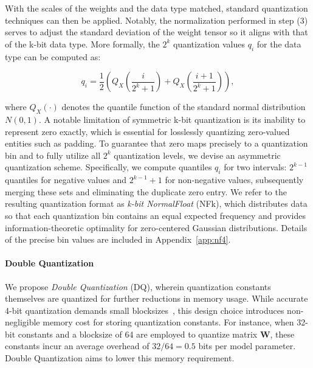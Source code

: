 With the scales of the weights and the data type matched, standard quantization techniques can then be applied. Notably, the normalization performed in step (3) serves to adjust the standard deviation of the weight tensor so it aligns with that of the k-bit data type. More formally, the $2^k$ quantization values $q_i$ for the data type can be computed as:

\begin{equation}
q_i  = \frac{1}{2}\left( Q_X\left(\frac{i}{2^k+1}\right) + Q_X\left(\frac{i+1}{2^k+1}\right)\right),
\end{equation}

where $Q_X(\cdot)$ denotes the quantile function of the standard normal distribution $N(0,1)$. A notable limitation of symmetric k-bit quantization is its inability to represent zero exactly, which is essential for losslessly quantizing zero-valued entities such as padding. To guarantee that zero maps precisely to a quantization bin and to fully utilize all $2^k$ quantization levels, we devise an asymmetric quantization scheme. Specifically, we compute quantiles $q_i$ for two intervals: $2^{k-1}$ quantiles for negative values and $2^{k-1}+1$ for non-negative values, subsequently merging these sets and eliminating the duplicate zero entry. We refer to the resulting quantization format as \emph{k-bit NormalFloat} (NFk), which distributes data so that each quantization bin contains an equal expected frequency and provides information-theoretic optimality for zero-centered Gaussian distributions. Details of the precise bin values are included in Appendix~\ref{app:nf4}.

\paragraph{Double Quantization{}} 
We propose \emph{Double Quantization} (DQ), wherein quantization constants themselves are quantized for further reductions in memory usage. While accurate 4-bit quantization demands small blocksizes~\citep{dettmers2022case}, this design choice introduces non-negligible memory cost for storing quantization constants. For instance, when 32-bit constants and a blocksize of 64 are employed to quantize matrix $\mathbf{W}$, these constants incur an average overhead of $32/64 = 0.5$ bits per model parameter. Double Quantization aims to lower this memory requirement.

